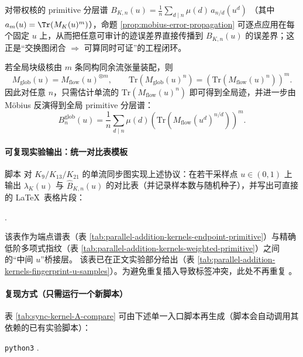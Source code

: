 \begin{remark}[带权情形的逐点版本]\label{rem:mobius-error-weighted-pointwise}
对带权核的 primitive 分层谱
\(
B_{K,n}(u)=\frac{1}{n}\sum_{d\mid n}\mu(d)\,a_{n/d}(u^d)
\)
（其中 \(a_m(u)=\Tr(M_K(u)^m)\)），命题 \ref{prop:mobius-error-propagation} 可逐点应用在每个固定 \(u\) 上，从而把任意可审计的迹误差界直接传播到 \(B_{K,n}(u)\) 的误差界；这正是“交换图闭合 \(\Rightarrow\) 可算同时可证”的工程闭环。
\end{remark}

\begin{proposition}\label{prop:hutchinson-global-lift}
若全局块级核由 $m$ 条同构同余流张量装配，则
\[
M_{\mathrm{glob}}(u)=M_{\mathrm{flow}}(u)^{\otimes m},
\qquad
\mathrm{Tr}\!\left(M_{\mathrm{glob}}(u)^n\right)=\left(\mathrm{Tr}\!\left(M_{\mathrm{flow}}(u)^n\right)\right)^m.
\]
因此对任意 $n$，只需估计单流的 $\mathrm{Tr}(M_{\mathrm{flow}}(u)^n)$ 即可得到全局迹，并进一步由 Möbius 反演得到全局 primitive 分层谱：
\[
B^{\mathrm{glob}}_{n}(u)=\frac{1}{n}\sum_{d\mid n}\mu(d)\left(\mathrm{Tr}\!\left(M_{\mathrm{flow}}(u^d)^{n/d}\right)\right)^m.
\]
\end{proposition}

\paragraph{可复现实验输出：统一对比表模板}
脚本  对 $K_9/K_{13}/K_{21}$ 的单流同步图实现上述协议：在若干采样点 $u\in(0,1)$ 上输出 $\lambda_K(u)$ 与 $\widehat B_{K,n}(u)$ 的对比表（并记录样本数与随机种子），并写出可直接 \verb|| 的 \LaTeX\ 表格片段：
\begin{center}
.
\end{center}
该表作为端点谱表（表 \ref{tab:parallel-addition-kernels-endpoint-primitive}）与精确低阶多项式指纹（表 \ref{tab:parallel-addition-kernels-weighted-primitive}）之间的“中间 $u$”桥接层。
该表已在正文实验部分给出（表 \ref{tab:parallel-addition-kernels-fingerprint-u-samples}）。为避免重复插入导致标签冲突，此处不再重复 \verb||。

\paragraph{复现方式（只需运行一个新脚本）}
表 \ref{tab:sync-kernel-A-compare} 可由下述单一入口脚本再生成（脚本会自动调用其依赖的已有实验脚本）：
\begin{center}
\texttt{python3} .
\end{center}

